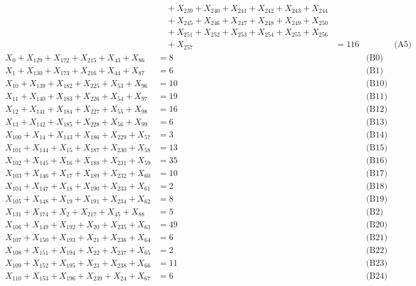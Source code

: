 \documentclass[a4paper,10pt]{article}
\begin{document}
{\begin{align}
&\quad  + X_{239} + X_{240} + X_{241} + X_{242} + X_{243} + X_{244} \\[0.5ex]
&\quad  + X_{245} + X_{246} + X_{247} + X_{248} + X_{249} + X_{250} \\[0.5ex]
&\quad  + X_{251} + X_{252} + X_{253} + X_{254} + X_{255} + X_{256} \\[0.5ex]
&\quad  + X_{257} &= 116 && \text{(A5)} \\
X_{0} + X_{129} + X_{172} + X_{215} + X_{43} + X_{86} &= 8 && \text{(B0)} \\
X_{1} + X_{130} + X_{173} + X_{216} + X_{44} + X_{87} &= 6 && \text{(B1)} \\
X_{10} + X_{139} + X_{182} + X_{225} + X_{53} + X_{96} &= 10 && \text{(B10)} \\
X_{11} + X_{140} + X_{183} + X_{226} + X_{54} + X_{97} &= 19 && \text{(B11)} \\
X_{12} + X_{141} + X_{184} + X_{227} + X_{55} + X_{98} &= 16 && \text{(B12)} \\
X_{13} + X_{142} + X_{185} + X_{228} + X_{56} + X_{99} &= 6 && \text{(B13)} \\
X_{100} + X_{14} + X_{143} + X_{186} + X_{229} + X_{57} &= 3 && \text{(B14)} \\
X_{101} + X_{144} + X_{15} + X_{187} + X_{230} + X_{58} &= 13 && \text{(B15)} \\
X_{102} + X_{145} + X_{16} + X_{188} + X_{231} + X_{59} &= 35 && \text{(B16)} \\
X_{103} + X_{146} + X_{17} + X_{189} + X_{232} + X_{60} &= 10 && \text{(B17)} \\
X_{104} + X_{147} + X_{18} + X_{190} + X_{233} + X_{61} &= 2 && \text{(B18)} \\
X_{105} + X_{148} + X_{19} + X_{191} + X_{234} + X_{62} &= 8 && \text{(B19)} \\
X_{131} + X_{174} + X_{2} + X_{217} + X_{45} + X_{88} &= 5 && \text{(B2)} \\
X_{106} + X_{149} + X_{192} + X_{20} + X_{235} + X_{63} &= 49 && \text{(B20)} \\
\allowbreak
X_{107} + X_{150} + X_{193} + X_{21} + X_{236} + X_{64} &= 6 && \text{(B21)} \\
X_{108} + X_{151} + X_{194} + X_{22} + X_{237} + X_{65} &= 2 && \text{(B22)} \\
X_{109} + X_{152} + X_{195} + X_{23} + X_{238} + X_{66} &= 11 && \text{(B23)} \\
X_{110} + X_{153} + X_{196} + X_{239} + X_{24} + X_{67} &= 6 && \text{(B24)} \\

\end{align}}
\end{document}
